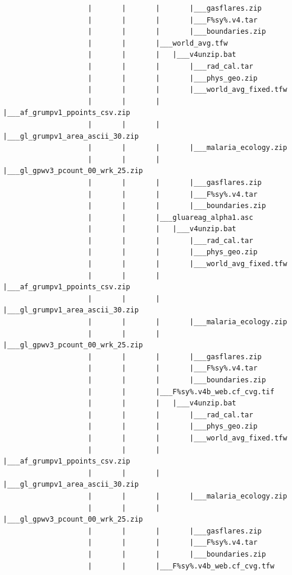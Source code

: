 \documentclass[
]{book}
\begin{document}
\begin{verbatim}
                    |       |       |       |___gasflares.zip
                    |       |       |       |___F%sy%.v4.tar
                    |       |       |       |___boundaries.zip
                    |       |       |___world_avg.tfw
                    |       |       |   |___v4unzip.bat
                    |       |       |       |___rad_cal.tar
                    |       |       |       |___phys_geo.zip
                    |       |       |       |___world_avg_fixed.tfw
                    |       |       |       |___af_grumpv1_ppoints_csv.zip
                    |       |       |       |___gl_grumpv1_area_ascii_30.zip
                    |       |       |       |___malaria_ecology.zip
                    |       |       |       |___gl_gpwv3_pcount_00_wrk_25.zip
                    |       |       |       |___gasflares.zip
                    |       |       |       |___F%sy%.v4.tar
                    |       |       |       |___boundaries.zip
                    |       |       |___gluareag_alpha1.asc
                    |       |       |   |___v4unzip.bat
                    |       |       |       |___rad_cal.tar
                    |       |       |       |___phys_geo.zip
                    |       |       |       |___world_avg_fixed.tfw
                    |       |       |       |___af_grumpv1_ppoints_csv.zip
                    |       |       |       |___gl_grumpv1_area_ascii_30.zip
                    |       |       |       |___malaria_ecology.zip
                    |       |       |       |___gl_gpwv3_pcount_00_wrk_25.zip
                    |       |       |       |___gasflares.zip
                    |       |       |       |___F%sy%.v4.tar
                    |       |       |       |___boundaries.zip
                    |       |       |___F%sy%.v4b_web.cf_cvg.tif
                    |       |       |   |___v4unzip.bat
                    |       |       |       |___rad_cal.tar
                    |       |       |       |___phys_geo.zip
                    |       |       |       |___world_avg_fixed.tfw
                    |       |       |       |___af_grumpv1_ppoints_csv.zip
                    |       |       |       |___gl_grumpv1_area_ascii_30.zip
                    |       |       |       |___malaria_ecology.zip
                    |       |       |       |___gl_gpwv3_pcount_00_wrk_25.zip
                    |       |       |       |___gasflares.zip
                    |       |       |       |___F%sy%.v4.tar
                    |       |       |       |___boundaries.zip
                    |       |       |___F%sy%.v4b_web.cf_cvg.tfw

\end{verbatim}
\end{document}
